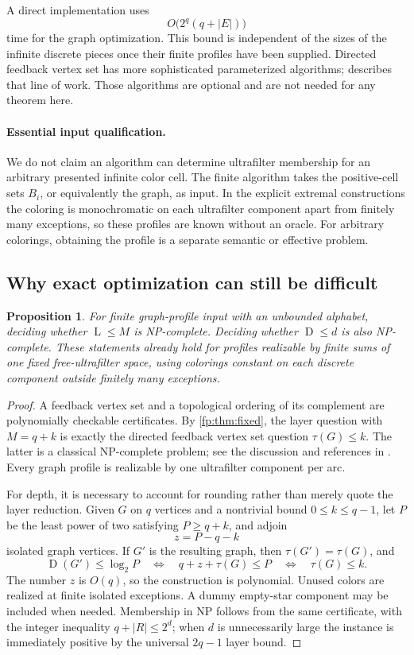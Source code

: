 \documentclass[11pt,letterpaper]{article}
\numberwithin{equation}{section}
\newtheorem{proposition}[proposition]{Proposition}
\theoremstyle{definition}
\theoremstyle{remark}
\theoremstyle{definition}
\newcommand{\depth}{\operatorname{D}}
\newcommand{\layers}{\operatorname{L}}
\begin{document}
A direct implementation uses
\[
 O\bigl(2^q(q+|E|)\bigr)
\]
time for the graph optimization. This bound is independent of the sizes
of the infinite discrete pieces once their finite profiles have been
supplied. Directed feedback vertex set has more sophisticated parameterized
algorithms; \cite{GMM} describes that line of work. Those algorithms are
optional and are not needed for any theorem here.

\paragraph{Essential input qualification.}
We do not claim an algorithm can determine ultrafilter membership for an
arbitrary presented infinite color cell. The finite algorithm takes the
positive-cell sets \(B_i\), or equivalently the graph, as input. In the
explicit extremal constructions the coloring is monochromatic on each
ultrafilter component apart from finitely many exceptions, so these profiles
are known without an oracle. For arbitrary colorings, obtaining the profile
is a separate semantic or effective problem.

\subsection{Why exact optimization can still be difficult}

\begin{proposition}\label{fp:prop:complexity}
For finite graph-profile input with an unbounded alphabet, deciding whether
\(\layers\leq M\) is NP-complete. Deciding whether \(\depth\leq d\) is
also NP-complete. These statements already hold for profiles realizable by
finite sums of one fixed free-ultrafilter space, using colorings constant
on each discrete component outside finitely many exceptions.
\end{proposition}
\begin{proof}
A feedback vertex set and a topological ordering of its complement are
polynomially checkable certificates. By \cref{fp:thm:fixed}, the layer
question with \(M=q+k\) is exactly the directed feedback vertex set
question \(\tau(G)\leq k\). The latter is a classical NP-complete
problem; see the discussion and references in \cite{GMM}. Every graph
profile is realizable by one ultrafilter component per arc.

For depth, it is necessary to account for rounding rather than merely
quote the layer reduction. Given \(G\) on \(q\) vertices and a
nontrivial bound \(0\leq k\leq q-1\), let \(P\) be the least power
of two satisfying \(P\geq q+k\), and adjoin
\[
 z=P-q-k
\]
isolated graph vertices. If \(G'\) is the resulting graph, then
\(\tau(G')=\tau(G)\), and
\[
 \depth(G')\leq\log_2P
 \quad\Longleftrightarrow\quad
 q+z+\tau(G)\leq P
 \quad\Longleftrightarrow\quad
 \tau(G)\leq k.
\]
The number \(z\) is \(O(q)\), so the construction is polynomial.
Unused colors are realized at finite isolated exceptions. A dummy
empty-star component may be included when needed. Membership in NP follows
from the same certificate, with the integer inequality
\(q+|R|\leq2^d\); when \(d\) is unnecessarily large the instance is
immediately positive by the universal \(2q-1\) layer bound.
\end{proof}
\end{document}
